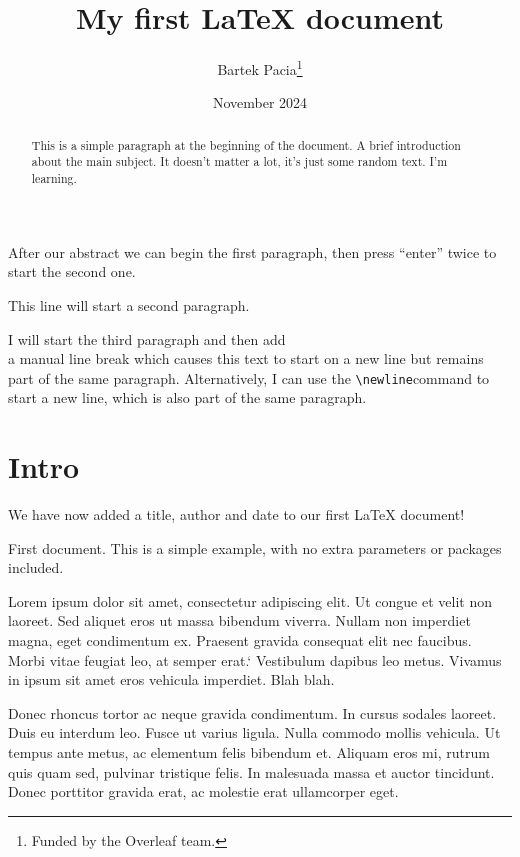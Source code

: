 \documentclass[12pt, letterpaper]{article}
\title{My first LaTeX document}
\author{Bartek Pacia\thanks{Funded by the Overleaf team.}}
\date{November 2024}
\begin{document}

    \maketitle

    \begin{abstract}
        This is a simple paragraph at the beginning of the document.
        A brief introduction about the main subject.
        It doesn't matter a lot, it's just some random text.
        I'm learning.
    \end{abstract}

    \tableofcontents

    After our abstract we can begin the first paragraph, then press ``enter'' twice to start the second one.

    This line will start a second paragraph.

    I will start the third paragraph and then add \\ a manual line break which causes this text to start on a new line but remains part of the same paragraph. Alternatively, I can use the \verb|\newline|\newline command to start a new line, which is also part of the same paragraph.


    \section{Intro}\label{sec:intro}

    We have now added a title, author and date to our first \LaTeX{} document!

    First document.
    This is a simple example, with no extra parameters or packages included.

    Lorem ipsum dolor sit amet, consectetur adipiscing elit.
    Ut congue et velit non laoreet.
    Sed aliquet eros ut massa bibendum viverra.
    Nullam non imperdiet magna, eget condimentum ex.
    Praesent gravida consequat elit nec faucibus.
    Morbi vitae feugiat leo, at semper erat.`
    Vestibulum dapibus leo metus.
    Vivamus in ipsum sit amet eros vehicula imperdiet.
    Blah blah.

    Donec rhoncus tortor ac neque gravida condimentum.
    In cursus sodales laoreet.
    Duis eu interdum leo.
    Fusce ut varius ligula.
    Nulla commodo mollis vehicula.
    Ut tempus ante metus, ac elementum felis bibendum et.
    Aliquam eros mi, rutrum quis quam sed, pulvinar tristique felis.
    In malesuada massa et auctor tincidunt.
    Donec porttitor gravida erat, ac molestie erat ullamcorper eget.
\end{document}
